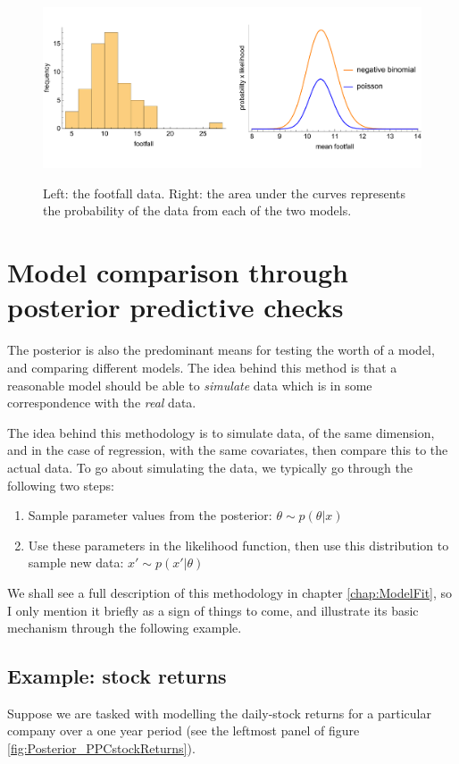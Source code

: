 \documentclass[11pt,fullpage]{book}
\begin{document}
\begin{figure}
\centering
\scalebox{0.45} 
{\includegraphics{Posterior_modelComparisonFootfall.pdf}}
\caption{Left: the footfall data. Right: the area under the curves represents the probability of the data from each of the two models.}\label{fig:Posterior_modelComparisonFootfall}
\end{figure}



\section{Model comparison through posterior predictive checks}
The posterior is also the predominant means for testing the worth of a model, and comparing different models. The idea behind this method is that a reasonable model should be able to \textit{simulate} data which is in some correspondence with the \textit{real} data. 

The idea behind this methodology is to simulate data, of the same dimension, and in the case of regression, with the same covariates, then compare this to the actual data. To go about simulating the data, we typically go through the following two steps:

\begin{enumerate}
\item Sample parameter values from the posterior: $\theta\sim p(\theta|x)$
\item Use these parameters in the likelihood function, then use this distribution to sample new data: $x'\sim p(x'|\theta)$
\end{enumerate}

We shall see a full description of this methodology in chapter \ref{chap:ModelFit}, so I only mention it briefly as a sign of things to come, and illustrate its basic mechanism through the following example.

\subsection{Example: stock returns}
Suppose we are tasked with modelling the daily-stock returns for a particular company over a one year period (see the leftmost panel of figure \ref{fig:Posterior_PPCstockReturns}). 
\end{document}
